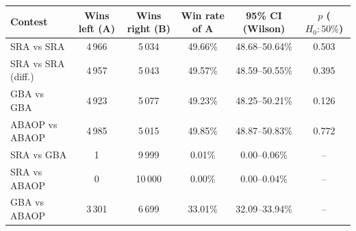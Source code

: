 \begin{tabular}{|l|c|c|c|c|c|}
\hline
\rowcolor{blue!20}
Contest & Wins left (A) & Wins right (B) & Win rate of A & 95\% CI (Wilson) & $p$ ($H_0\!: 50\%$) \\ \hline
SRA vs SRA & 4\,966 & 5\,034 & 49.66\% & 48.68--50.64\% & 0.503 \\ \hline
SRA vs SRA (diff.) & 4\,957 & 5\,043 & 49.57\% & 48.59--50.55\% & 0.395 \\ \hline
GBA vs GBA & 4\,923 & 5\,077 & 49.23\% & 48.25--50.21\% & 0.126 \\ \hline
ABAOP vs ABAOP & 4\,985 & 5\,015 & 49.85\% & 48.87--50.83\% & 0.772 \\ \hline
SRA vs GBA & 1 & 9\,999 & 0.01\% & 0.00--0.06\% & -- \\ \hline
SRA vs ABAOP & 0 & 10\,000 & 0.00\% & 0.00--0.04\% & -- \\ \hline
GBA vs ABAOP & 3\,301 & 6\,699 & 33.01\% & 32.09--33.94\% & -- \\ \hline
\end{tabular}
